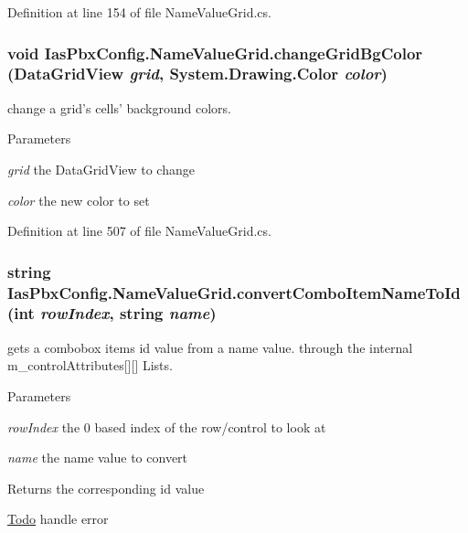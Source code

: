 Definition at line 154 of file NameValueGrid.cs.\hypertarget{class_ias_pbx_config_1_1_name_value_grid_af0f5a477e7dc8c4903278ca045fdc56f}{
\subsubsection[{changeGridBgColor}]{\setlength{\rightskip}{0pt plus 5cm}void IasPbxConfig.NameValueGrid.changeGridBgColor (DataGridView {\em grid}, \/  System.Drawing.Color {\em color})}}
\label{class_ias_pbx_config_1_1_name_value_grid_af0f5a477e7dc8c4903278ca045fdc56f}


change a grid's cells' background colors. 
\begin{DoxyParams}{Parameters}
\item[{\em grid}]the DataGridView to change \item[{\em color}]the new color to set \end{DoxyParams}


Definition at line 507 of file NameValueGrid.cs.\hypertarget{class_ias_pbx_config_1_1_name_value_grid_afa2c2d0522757b0450a5cbbe6a19d526}{
\subsubsection[{convertComboItemNameToId}]{\setlength{\rightskip}{0pt plus 5cm}string IasPbxConfig.NameValueGrid.convertComboItemNameToId (int {\em rowIndex}, \/  string {\em name})}}
\label{class_ias_pbx_config_1_1_name_value_grid_afa2c2d0522757b0450a5cbbe6a19d526}


gets a combobox items id value from a name value. through the internal m\_\-controlAttributes\mbox{[}\mbox{]}\mbox{[}\mbox{]} Lists. 
\begin{DoxyParams}{Parameters}
\item[{\em rowIndex}]the 0 based index of the row/control to look at \item[{\em name}]the name value to convert \end{DoxyParams}
\begin{DoxyReturn}{Returns}
the corresponding id value 
\end{DoxyReturn}
\begin{Desc}
\item[\hyperlink{todo__todo000043}{Todo}]handle error \end{Desc}



